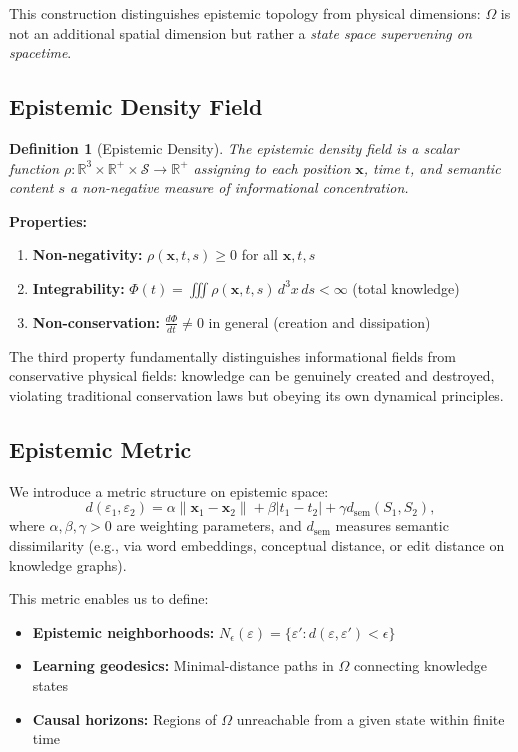 \documentclass[12pt]{article}
\newtheorem{definition}[theorem]{Definition}
\begin{document}
This construction distinguishes epistemic topology from physical dimensions: $\Omega$ is not an additional spatial dimension but rather a \emph{state space supervening on spacetime}.

\subsection{Epistemic Density Field}

\begin{definition}[Epistemic Density]
The \emph{epistemic density field} is a scalar function $\rho: \mathbb{R}^3 \times \mathbb{R}^+ \times \mathcal{S} \to \mathbb{R}^+$ assigning to each position $\mathbf{x}$, time $t$, and semantic content $s$ a non-negative measure of informational concentration.
\end{definition}

\textbf{Properties:}
\begin{enumerate}
    \item \textbf{Non-negativity:} $\rho(\mathbf{x},t,s) \geq 0$ for all $\mathbf{x}, t, s$
    \item \textbf{Integrability:} $\Phi(t) = \iiint \rho(\mathbf{x},t,s)\, d^3x\, ds < \infty$ (total knowledge)
    \item \textbf{Non-conservation:} $\frac{d\Phi}{dt} \neq 0$ in general (creation and dissipation)
\end{enumerate}

The third property fundamentally distinguishes informational fields from conservative physical fields: knowledge can be genuinely created and destroyed, violating traditional conservation laws but obeying its own dynamical principles.

\subsection{Epistemic Metric}

We introduce a metric structure on epistemic space:
\begin{equation}
    d(\varepsilon_1, \varepsilon_2) = \alpha \|\mathbf{x}_1 - \mathbf{x}_2\| + \beta |t_1 - t_2| + \gamma d_{\text{sem}}(S_1, S_2),
    \label{eq:metric}
\end{equation}
where $\alpha, \beta, \gamma > 0$ are weighting parameters, and $d_{\text{sem}}$ measures semantic dissimilarity (e.g., via word embeddings, conceptual distance, or edit distance on knowledge graphs).

This metric enables us to define:
\begin{itemize}
    \item \textbf{Epistemic neighborhoods:} $N_\epsilon(\varepsilon) = \{\varepsilon' : d(\varepsilon, \varepsilon') < \epsilon\}$
    \item \textbf{Learning geodesics:} Minimal-distance paths in $\Omega$ connecting knowledge states
    \item \textbf{Causal horizons:} Regions of $\Omega$ unreachable from a given state within finite time
\end{itemize}
\end{document}
